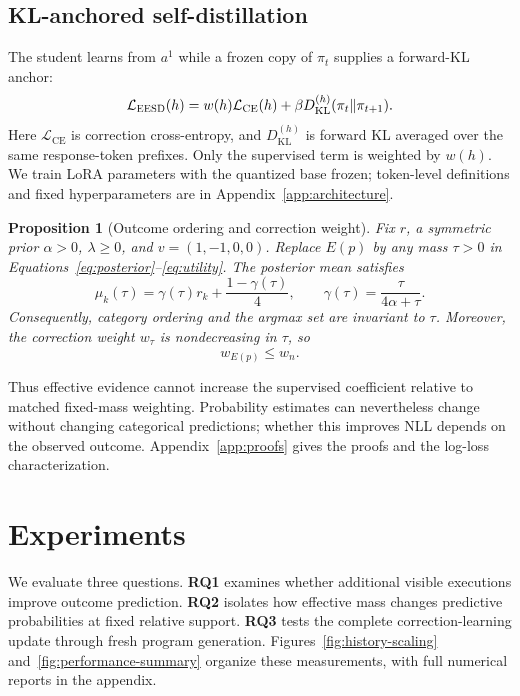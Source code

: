\documentclass{article}
\newcommand{\method}{\textsc{EESD}\xspace}
\newtheorem{proposition}{Proposition}
\begin{document}
\subsection{KL-anchored self-distillation}

The student learns from $a^1$ while a frozen copy of $\pi_t$ supplies a forward-KL anchor:
\begin{equation}
\mathcal L_{\method}(h)
=
w(h)\mathcal L_{\mathrm{CE}}(h)
+\beta D_{\mathrm{KL}}^{(h)}(\pi_t\Vert\pi_{t+1}).
\label{eq:eesd-loss}
\end{equation}
Here $\mathcal L_{\mathrm{CE}}$ is correction cross-entropy, and $D_{\mathrm{KL}}^{(h)}$ is forward KL averaged over the same response-token prefixes. Only the supervised term is weighted by $w(h)$. We train LoRA parameters with the quantized base frozen; token-level definitions and fixed hyperparameters are in Appendix~\ref{app:architecture}.

\label{sec:theory}
\begin{proposition}[Outcome ordering and correction weight]
\label{prop:direction-strength}
Fix $r$, a symmetric prior $\alpha>0$, $\lambda\ge0$, and $v=(1,-1,0,0)$. Replace $E(p)$ by any mass $\tau>0$ in Equations~\ref{eq:posterior}--\ref{eq:utility}. The posterior mean satisfies
\begin{equation}
\mu_k(\tau)
=\gamma(\tau)r_k+\frac{1-\gamma(\tau)}{4},
\qquad
\gamma(\tau)=\frac{\tau}{4\alpha+\tau}.
\label{eq:shrinkage}
\end{equation}
Consequently, category ordering and the argmax set are invariant to $\tau$. Moreover, the correction weight $w_\tau$ is nondecreasing in $\tau$, so
\begin{equation}
w_{E(p)}\le w_n.
\label{eq:weight-attenuation}
\end{equation}
\end{proposition}
Thus effective evidence cannot increase the supervised coefficient relative to matched fixed-mass weighting. Probability estimates can nevertheless change without changing categorical predictions; whether this improves NLL depends on the observed outcome. Appendix~\ref{app:proofs} gives the proofs and the log-loss characterization.




\section{Experiments}
\label{sec:experiments}

We evaluate three questions. \textbf{RQ1} examines whether additional visible executions improve outcome prediction. \textbf{RQ2} isolates how effective mass changes predictive probabilities at fixed relative support. \textbf{RQ3} tests the complete correction-learning update through fresh program generation. Figures~\ref{fig:history-scaling} and~\ref{fig:performance-summary} organize these measurements, with full numerical reports in the appendix.
\end{document}
